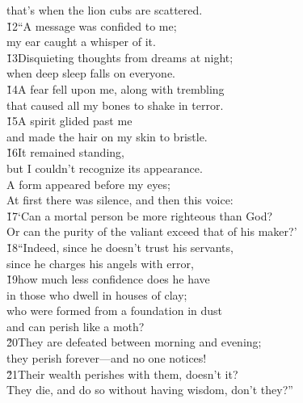 \begin{poetry}
\poemll    that's when the lion cubs are scattered. \\
\poeml \v{12}``A message was confided to me; \\
\poemll    my ear caught a whisper of it. \\
\poeml \v{13}Disquieting thoughts from dreams at night; \\
\poemll    when deep sleep falls on everyone. \\
\poeml \v{14}A fear fell upon me, along with trembling \\
\poemll    that caused all my bones to shake in terror. \\
\poeml \v{15}A spirit glided past me \\
\poemll    and made the hair on my skin to bristle. \\
\poeml \v{16}It remained standing, \\
\poemll    but I couldn't recognize its appearance. \\
\poeml A form appeared before my eyes; \\
\poemll    At first there was silence, and then this voice: \\
\poeml \v{17}`Can a mortal person be more righteous than God? \\
\poemll    Or can the purity of the valiant exceed that of his maker?' \\
\poeml \v{18}``Indeed, since he doesn't trust his servants, \\
\poemll    since he charges his angels with error, \\
\poeml \v{19}how much less confidence does he have \\
\poemll    in those who dwell in houses of clay; \\
\poeml who were formed from a foundation in dust \\
\poemll    and can perish like a moth? \\
\poeml \v{20}They are defeated between morning and evening; \\
\poemll    they perish forever---and no one notices! \\
\poeml \v{21}Their wealth perishes with them, doesn't it? \\
\poemll    They die, and do so without having wisdom, don't they?''
\end{poetry}

